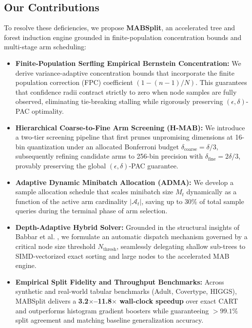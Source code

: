\subsection{Our Contributions}
To resolve these deficiencies, we propose \textbf{MABSplit}, an accelerated tree and forest induction engine grounded in finite-population concentration bounds and multi-stage arm scheduling:
\begin{itemize}
    \item \textbf{Finite-Population Serfling Empirical Bernstein Concentration:} We derive variance-adaptive concentration bounds that incorporate the finite population correction (FPC) coefficient $(1 - (n-1)/N)$. This guarantees that confidence radii contract strictly to zero when node samples are fully observed, eliminating tie-breaking stalling while rigorously preserving $(\epsilon, \delta)$-PAC optimality.
    \item \textbf{Hierarchical Coarse-to-Fine Arm Screening (H-MAB):} We introduce a two-tier screening pipeline that first prunes unpromising dimensions at 16-bin quantization under an allocated Bonferroni budget $\delta_{\text{coarse}} = \delta/3$, subsequently refining candidate arms to 256-bin precision with $\delta_{\text{fine}} = 2\delta/3$, provably preserving the global $(\epsilon, \delta)$-PAC guarantee.
    \item \textbf{Adaptive Dynamic Minibatch Allocation (ADMA):} We develop a sample allocation schedule that scales minibatch size $M_t$ dynamically as a function of the active arm cardinality $|\mathcal{A}_t|$, saving up to 30\% of total sample queries during the terminal phase of arm selection.
    \item \textbf{Depth-Adaptive Hybrid Solver:} Grounded in the structural insights of Babbar et al. \cite{babbar2024near}, we formulate an automatic dispatch mechanism governed by a critical node size threshold $N_{\text{thresh}}$, seamlessly delegating shallow sub-trees to SIMD-vectorized exact sorting and large nodes to the accelerated MAB engine.
    \item \textbf{Empirical Split Fidelity and Throughput Benchmarks:} Across synthetic and real-world tabular benchmarks (Adult, Covertype, HIGGS), MABSplit delivers a \textbf{3.2$\times$--11.8$\times$ wall-clock speedup} over exact CART and outperforms histogram gradient boosters while guaranteeing $>99.1\%$ split agreement and matching baseline generalization accuracy.
\end{itemize}
